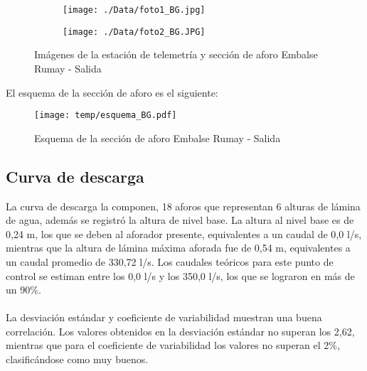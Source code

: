\documentclass[]{article}
\begin{document}
\begin{figure}[H]
  \centering
\begin{subfigure}{.49\textwidth}
  \texttt{[image: ./Data/foto1\_BG.jpg]}
\end{subfigure}
\hfill
\begin{subfigure}{.49\textwidth}
  \texttt{[image: ./Data/foto2\_BG.JPG]}
\end{subfigure}
\caption{Imágenes de la estación de telemetría y sección de aforo Embalse Rumay - Salida }
\label{fig:fotos_33}
\end{figure}

El esquema de la sección de aforo es el siguiente:

\begin{figure}[H]
  \centering
  \texttt{[image: temp/esquema\_BG.pdf]}
\caption{Esquema de la sección de aforo Embalse Rumay - Salida }
\label{fig:Esquema_BG}
\end{figure}

\subsection{Curva de descarga}\label{curva-de-descarga-32}

La curva de descarga la componen, 18 aforos que representan 6 alturas de lámina de agua, además se registró la altura de nivel base. La altura al nivel base es de 0,24 m, los que se deben al aforador presente, equivalentes a un caudal de 0,0 l/s, mientras que la altura de lámina máxima aforada fue de 0,54 m, equivalentes a un caudal promedio de 330,72 l/s. Los caudales teóricos para este punto de control se estiman entre los 0,0 l/s y los 350,0 l/s, los que se lograron en más de un 90\%.\\
\\
La desviación estándar y coeficiente de variabilidad muestran una buena correlación. Los valores obtenidos en la desviación estándar no superan los 2,62, mientras que para el coeficiente de variabilidad los valores no superan el 2\%, clasificándose como muy buenos.
\end{document}
